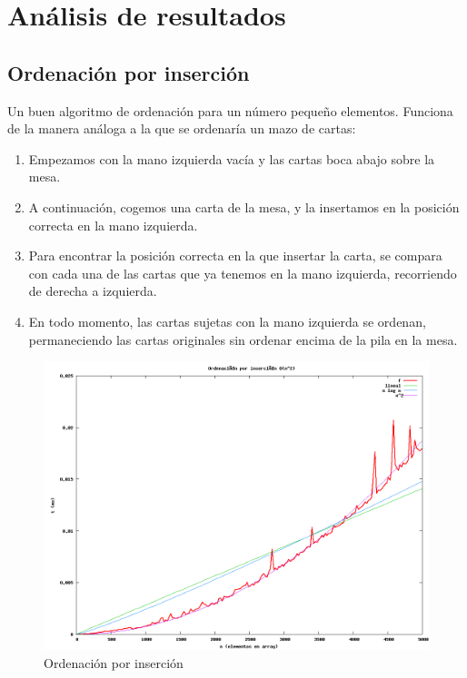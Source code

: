 \section{Análisis de resultados}

\subsection{Ordenación por inserci\'on}
Un buen algoritmo de ordenación para un número pequeño elementos. Funciona de la manera análoga a la que se ordenaría un mazo de cartas:
\begin{enumerate}
\item Empezamos con la mano izquierda vacía y las cartas boca abajo sobre la mesa.
\item A continuación, cogemos una carta de la mesa, y la insertamos en la posición correcta en la mano izquierda.
\item Para encontrar la posición correcta en la que insertar la carta, se compara con cada una de las cartas que ya tenemos en la mano izquierda, recorriendo de derecha a izquierda.
\item En todo momento, las cartas sujetas con la mano izquierda se ordenan, permaneciendo las cartas originales sin ordenar encima de la pila en la mesa.
\end{enumerate}

	\begin{figure}[H]
  		\centering
   		 \includegraphics[width=1.0\textwidth]{insertion-sort.png}
  		\caption{Ordenación por inserción}
 			 \label{fig:insertion}
		\end{figure}

